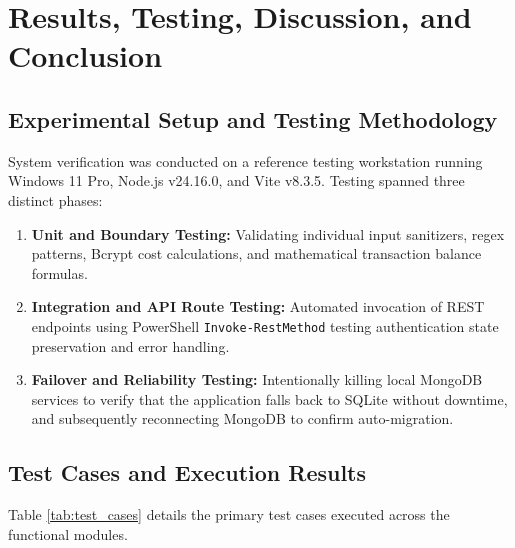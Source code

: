 \chapter{Results, Testing, Discussion, and Conclusion}

\section{Experimental Setup and Testing Methodology}
System verification was conducted on a reference testing workstation running Windows 11 Pro, Node.js v24.16.0, and Vite v8.3.5. Testing spanned three distinct phases:
\begin{enumerate}
    \item \textbf{Unit and Boundary Testing:} Validating individual input sanitizers, regex patterns, Bcrypt cost calculations, and mathematical transaction balance formulas.
    \item \textbf{Integration and API Route Testing:} Automated invocation of REST endpoints using PowerShell \texttt{Invoke-RestMethod} testing authentication state preservation and error handling.
    \item \textbf{Failover and Reliability Testing:} Intentionally killing local MongoDB services to verify that the application falls back to SQLite without downtime, and subsequently reconnecting MongoDB to confirm auto-migration.
\end{enumerate}

\section{Test Cases and Execution Results}
Table \ref{tab:test_cases} details the primary test cases executed across the functional modules.

